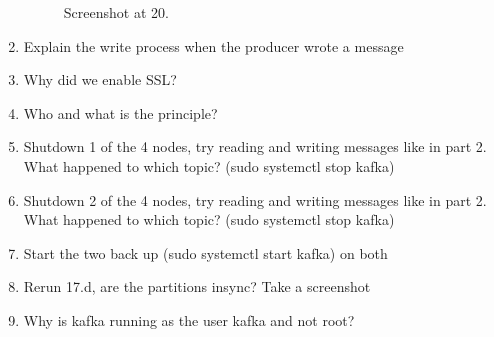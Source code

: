 \documentclass{article}
\begin{document}
\begin{enumerate}
\begin{figure}[H]
    \caption{Screenshot at 20.}
    \centering
  \end{figure}
  \item Explain the write process when the producer wrote a message
  \item Why did we enable SSL?
  \item Who and what is the principle?
  \item Shutdown 1 of the 4 nodes, try reading and writing messages like in part 2. What happened to which topic? (sudo systemctl stop kafka)
  \item Shutdown 2 of the 4 nodes, try reading and writing messages like in part 2. What happened to which topic? (sudo systemctl stop kafka)
  \item Start the two back up (sudo systemctl start kafka) on both
  \item Rerun 17.d, are the partitions insync? Take a screenshot
  \item Why is kafka running as the user kafka and not root?
\end{enumerate}
\end{document}
